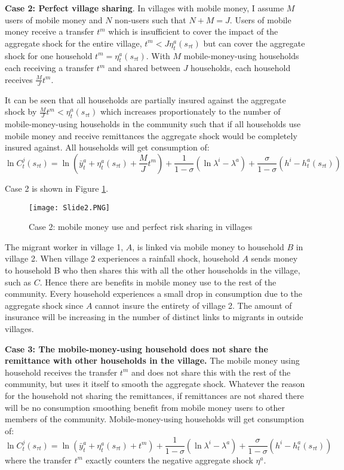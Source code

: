 \textbf{Case 2: Perfect village sharing}. In villages with mobile money, I assume $M$ users of mobile money and $N$ non-users such that $N+M=J$. Users of mobile money receive a transfer $t^m$ which is insufficient to cover the impact of the aggregate shock for the entire village, $t^m<J\eta_t^a(s_{\tau t})$ but can cover the aggregate shock for one household $t^m=\eta_t^a(s_{\tau t})$. With $M$ mobile-money-using households each receiving a transfer $t^m$ and shared between $J$ households, each household receives $\frac{M}{J}t^m$. 

It can be seen that all households are partially insured against the aggregate shock by $\frac{M}{J} t^m<\eta_t^a(s_{\tau t})$ which increases proportionately to the number of mobile-money-using households in the community such that if all households use mobile money and receive remittances the aggregate shock would be completely insured against. All households will get consumption of:
\begin{equation} \label{eq: perfect sharing}
\ln C_t^j(s_{\tau t}) = \ln (\bar{y}^a_t + \eta_t^a(s_{\tau t}) + \frac{M}{J}t^m) + \frac{1}{1-\sigma}(\ln \lambda^i- \lambda^a) + \frac{\sigma}{1-\sigma}(h^i- h^a_t(s_{\tau t}))
\end{equation}

Case 2 is shown in Figure \ref{fig:link}. 
\begin{figure}[p]
    \centering
\texttt{[image: Slide2.PNG]} 
\caption{Case 2: mobile money use and perfect risk sharing in villages}
    \label{fig:link}
\end{figure}
The migrant worker in village 1, $A$, is linked via mobile money to household $B$ in village 2. When village 2 experiences a rainfall shock, household $A$ sends money to household B who then shares this with all the other households in the village, such as $C$. Hence there are benefits in mobile money use to the rest of the community. Every household experiences a small drop in consumption due to the aggregate shock since $A$ cannot insure the entirety of village 2. The amount of insurance will be increasing in the number of distinct links to migrants in outside villages. 

\textbf{Case 3: The mobile-money-using household does not share the remittance with other households in the village.}
The mobile money using household receives the transfer $t^m$ and does not share this with the rest of the community,  but uses it itself to smooth the aggregate shock. Whatever the reason for the household not sharing the remittances, if remittances are not shared there will be no consumption smoothing benefit from mobile money users to other members of the community.  Mobile-money-using households will get consumption of:
\begin{equation} \label{eq: MM users}
\ln C_t^j(s_{\tau t}) = \ln (\bar{y}^a_t + \eta_t^a(s_{\tau t}) + t^m) + \frac{1}{1-\sigma}(\ln \lambda^i- \lambda^a) + \frac{\sigma}{1-\sigma}(h^i- h^a_t(s_{\tau t}))
\end{equation}
where the transfer $t^m$ exactly counters the negative aggregate shock $\eta^a$.

